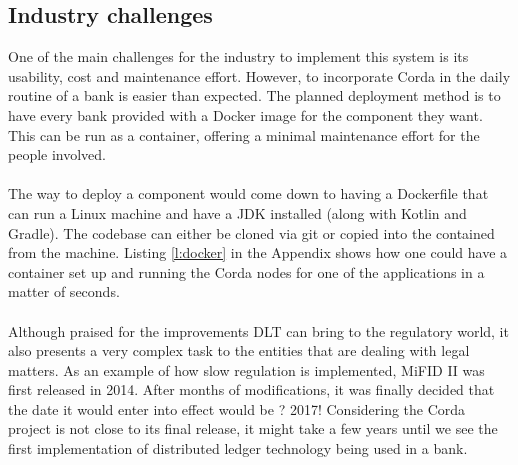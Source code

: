\documentclass[12pt,twoside]{article}
\begin{document}
\subsection{Industry challenges}
\label{sub:challenges}
One of the main challenges for the industry to implement this system is its usability, cost and maintenance effort. However, to incorporate Corda in the daily routine of a bank is easier than expected. The planned deployment method is to have every bank provided with a Docker image for the component they want. This can be run as a container, offering a minimal maintenance effort for the people involved.
\\ \\
The way to deploy a component would come down to having a Dockerfile that can run a Linux machine and have a JDK installed (along with Kotlin and Gradle). The codebase can either be cloned via git or copied into the contained from the machine. Listing \ref{l:docker} in the Appendix shows how one could have a container set up and running the Corda nodes for one of the applications in a matter of seconds.
\\ \\
Although praised for the improvements DLT can bring to the regulatory world, it also presents a very complex task to the entities that are dealing with legal matters. As an example of how slow regulation is implemented, MiFID II was first released in 2014. After months of modifications, it was finally decided that the date it would enter into effect would be ? 2017! Considering the Corda project is not close to its final release, it might take a few years until we see the first implementation of distributed ledger technology being used in a bank.
\newpage
\end{document}
